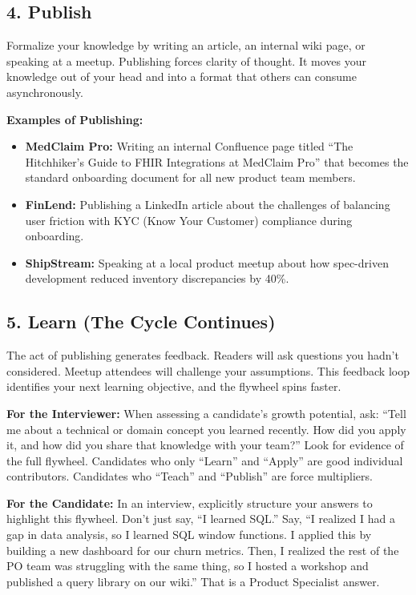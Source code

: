 \documentclass[
  11pt,
  openany,
  oneside]{book}
\providecommand{\tightlist}{%
  \setlength{\itemsep}{0pt}\setlength{\parskip}{0pt}}
\renewenvironment{quote}{\begin{customquote}}{\end{customquote}}
\begin{document}
\subsection{4. Publish}\label{publish}

Formalize your knowledge by writing an article, an internal wiki page,
or speaking at a meetup. Publishing forces clarity of thought. It moves
your knowledge out of your head and into a format that others can
consume asynchronously.

\textbf{Examples of Publishing:}

\begin{itemize}
\tightlist
\item
  \textbf{MedClaim Pro:} Writing an internal Confluence page titled
  ``The Hitchhiker's Guide to FHIR Integrations at MedClaim Pro'' that
  becomes the standard onboarding document for all new product team
  members.
\item
  \textbf{FinLend:} Publishing a LinkedIn article about the challenges
  of balancing user friction with KYC (Know Your Customer) compliance
  during onboarding.
\item
  \textbf{ShipStream:} Speaking at a local product meetup about how
  spec-driven development reduced inventory discrepancies by 40\%.
\end{itemize}

\subsection{5. Learn (The Cycle
Continues)}\label{learn-the-cycle-continues}

The act of publishing generates feedback. Readers will ask questions you
hadn't considered. Meetup attendees will challenge your assumptions.
This feedback loop identifies your next learning objective, and the
flywheel spins faster.

\begin{quote}
\textbf{For the Interviewer:} When assessing a candidate's growth
potential, ask: ``Tell me about a technical or domain concept you
learned recently. How did you apply it, and how did you share that
knowledge with your team?'' Look for evidence of the full flywheel.
Candidates who only ``Learn'' and ``Apply'' are good individual
contributors. Candidates who ``Teach'' and ``Publish'' are force
multipliers.
\end{quote}

\begin{quote}
\textbf{For the Candidate:} In an interview, explicitly structure your
answers to highlight this flywheel. Don't just say, ``I learned SQL.''
Say, ``I realized I had a gap in data analysis, so I learned SQL window
functions. I applied this by building a new dashboard for our churn
metrics. Then, I realized the rest of the PO team was struggling with
the same thing, so I hosted a workshop and published a query library on
our wiki.'' That is a Product Specialist answer.
\end{quote}
\end{document}
